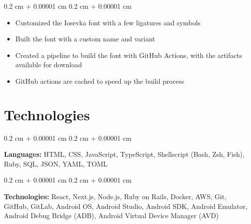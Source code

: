 \documentclass[10pt, a4paper]{article}
\newenvironment{highlights}{
    \begin{itemize}[
        topsep=0.10 cm,
        parsep=0.10 cm,
        partopsep=0pt,
        itemsep=0pt,
        leftmargin=0.4 cm + 10pt
    ]
}{
    \end{itemize}
} %
\newenvironment{onecolentry}{
    \begin{adjustwidth}{
        0.2 cm + 0.00001 cm
    }{
        0.2 cm + 0.00001 cm
    }
}{
    \end{adjustwidth}
} %
\begin{document}
        \vspace{0.10 cm}
        \begin{onecolentry}
            \begin{highlights}
                \item Customized the Iosevka font with a few ligatures and symbols
                \item Built the font with a custom name and variant
                \item Created a pipeline to build the font with GitHub Actions, with the artifacts available for download
                \item GitHub actions are cached to speed up the build process
            \end{highlights}
        \end{onecolentry}



    
    \section{Technologies}



        
        \begin{onecolentry}
            \textbf{Languages:} HTML, CSS, JavaScript, TypeScript, Shellscript (Bash, Zsh, Fish), Ruby, SQL, JSON, YAML, TOML
        \end{onecolentry}

        \vspace{0.2 cm}

        \begin{onecolentry}
            \textbf{Technologies:} React, Next.js, Node.js, Ruby on Rails, Docker, AWS, Git, GitHub, GitLab, Android OS, Android Studio, Android SDK, Android Emulator, Android Debug Bridge (ADB), Android Virtual Device Manager (AVD)
        \end{onecolentry}


    
\end{document}
